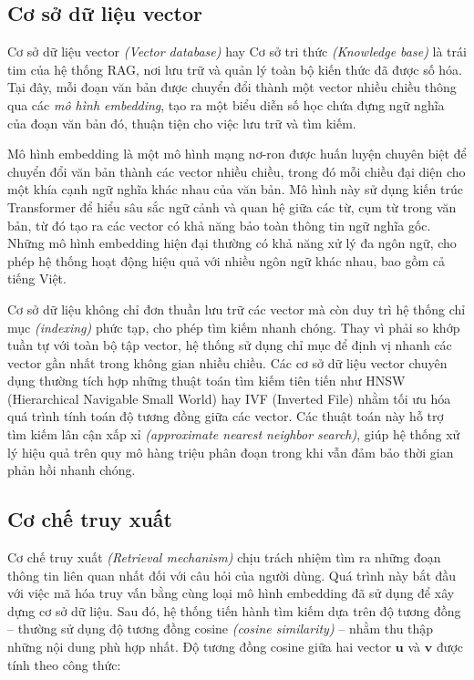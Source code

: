 \subsection{Cơ sở dữ liệu vector}

{Cơ sở dữ liệu vector} \emph{(Vector database)} hay {Cơ sở tri thức} \emph{(Knowledge base)} là trái tim của hệ thống RAG, nơi lưu trữ và quản lý toàn bộ kiến thức đã được số hóa. Tại đây, mỗi đoạn văn bản được chuyển đổi thành một vector nhiều chiều thông qua các \emph{mô hình embedding}, tạo ra một biểu diễn số học chứa đựng ngữ nghĩa của đoạn văn bản đó, thuận tiện cho việc lưu trữ và tìm kiếm.

Mô hình embedding là một mô hình mạng nơ-ron được huấn luyện chuyên biệt để chuyển đổi văn bản thành các vector nhiều chiều, trong đó mỗi chiều đại diện cho một khía cạnh ngữ nghĩa khác nhau của văn bản. Mô hình này sử dụng kiến trúc Transformer để hiểu sâu sắc ngữ cảnh và quan hệ giữa các từ, cụm từ trong văn bản, từ đó tạo ra các vector có khả năng bảo toàn thông tin ngữ nghĩa gốc. Những mô hình embedding hiện đại thường có khả năng xử lý đa ngôn ngữ, cho phép hệ thống hoạt động hiệu quả với nhiều ngôn ngữ khác nhau, bao gồm cả tiếng Việt.

Cơ sở dữ liệu không chỉ đơn thuần lưu trữ các vector mà còn duy trì hệ thống chỉ mục \emph{(indexing)} phức tạp, cho phép tìm kiếm nhanh chóng. Thay vì phải so khớp tuần tự với toàn bộ tập vector, hệ thống sử dụng chỉ mục để định vị nhanh các vector gần nhất trong không gian nhiều chiều. Các cơ sở dữ liệu vector chuyên dụng thường tích hợp những thuật toán tìm kiếm tiên tiến như HNSW {(Hierarchical Navigable Small World)} hay IVF {(Inverted File)} nhằm tối ưu hóa quá trình tính toán độ tương đồng giữa các vector. Các thuật toán này hỗ trợ tìm kiếm lân cận xấp xỉ \emph{(approximate nearest neighbor search)}, giúp hệ thống xử lý hiệu quả trên quy mô hàng triệu phân đoạn trong khi vẫn đảm bảo thời gian phản hồi nhanh chóng.

\subsection{Cơ chế truy xuất}

{Cơ chế truy xuất} \emph{(Retrieval mechanism)} chịu trách nhiệm tìm ra những đoạn thông tin liên quan nhất đối với câu hỏi của người dùng. Quá trình này bắt đầu với việc mã hóa truy vấn bằng cùng loại mô hình embedding đã sử dụng để xây dựng cơ sở dữ liệu. Sau đó, hệ thống tiến hành tìm kiếm dựa trên độ tương đồng -- thường sử dụng {độ tương đồng cosine} \emph{(cosine similarity)} -- nhằm thu thập những nội dung phù hợp nhất. Độ tương đồng cosine giữa hai vector \(\mathbf{u}\) và \(\mathbf{v}\) được tính theo công thức:

